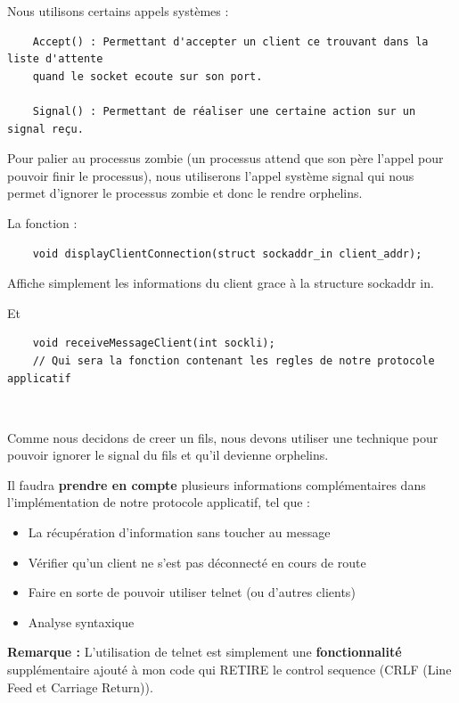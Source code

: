 Nous utilisons certains appels systèmes :

\begin{lstlisting}
    Accept() : Permettant d'accepter un client ce trouvant dans la liste d'attente 
    quand le socket ecoute sur son port.

    Signal() : Permettant de réaliser une certaine action sur un signal reçu.
\end{lstlisting}

Pour palier au processus zombie (un processus attend que son père l'appel pour pouvoir finir le processus), nous utiliserons l'appel système signal qui nous permet d'ignorer le processus zombie et donc le rendre orphelins. \\ \par

La fonction : \begin{lstlisting}
    void displayClientConnection(struct sockaddr_in client_addr);
\end{lstlisting}

Affiche simplement les informations du client grace à la structure sockaddr in.

Et  \begin{lstlisting}
    void receiveMessageClient(int sockli);
    // Qui sera la fonction contenant les regles de notre protocole applicatif
\end{lstlisting} \hfill \\ \par

Comme nous decidons de creer un fils, nous devons utiliser une technique
pour pouvoir ignorer le signal du fils et qu'il devienne orphelins.

Il faudra \textbf{prendre en compte} plusieurs informations complémentaires dans l'implémentation de notre protocole applicatif, tel que :
\begin{itemize}
    \item La récupération d'information sans toucher au message
    \item Vérifier qu'un client ne s'est pas déconnecté en cours de route
    \item Faire en sorte de pouvoir utiliser telnet (ou d'autres clients)
    \item Analyse syntaxique
\end{itemize}

\textbf{Remarque :}
    L'utilisation de telnet est simplement une \textbf{fonctionnalité} supplémentaire ajouté à mon code qui RETIRE le control sequence (CRLF (Line Feed et Carriage Return)). \\  \par
    

